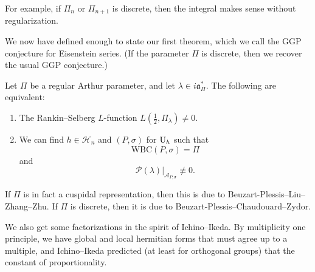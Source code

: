 \documentclass[reqno]{amsart} 
\begin{document}
For example, if $\Pi_n $ or $\Pi_{n + 1}$ is discrete, then the integral makes sense without regularization.

We now have defined enough to state our first theorem, which we call
the GGP conjecture for Eisenstein series.  (If the parameter $\Pi $ is discrete, then we recover the usual GGP conjecture.)

\begin{theorem}
  Let $\Pi$ be a regular Arthur parameter, and let $\lambda \in i \mathfrak{a}_\Pi^\ast$.  The following are equivalent:
  \begin{enumerate}
  \item The Rankin--Selberg $L$-function $L (\tfrac{1}{2}, \Pi_\lambda ) \neq 0$.
  \item We can find $h \in \mathcal{H}_n $ and $(P, \sigma )$ for $\operatorname{U}_h $ such that
    \begin{equation*}
      \mathrm{WBC} (P, \sigma) = \Pi
    \end{equation*}
    and
    \begin{equation*}
      \mathcal{P} (\lambda)  |_{\mathcal{A}_{P, \sigma}} \not \equiv 0.
    \end{equation*}
  \end{enumerate}
\end{theorem}
\begin{remark}
  If $\Pi$ is in fact a cuspidal representation, then this is due to Beuzart-Plessis--Liu--Zhang--Zhu.  If $\Pi$ is discrete, then it is due to Beuzart-Plessis--Chaudouard--Zydor.
\end{remark}

We also get some factorizations in the spirit of Ichino--Ikeda.  By multiplicity one principle, we have global and local hermitian forms that must agree up to a multiple, and Ichino--Ikeda predicted (at least for orthogonal groups) that the constant of proportionality.
\end{document}
